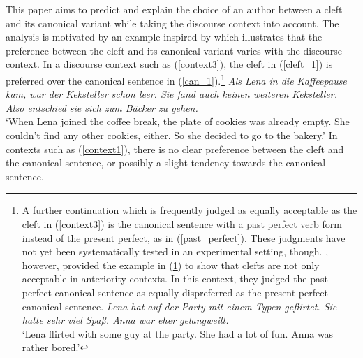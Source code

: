 \documentclass[output=paper,colorlinks,citecolor=brown]{langscibook}
\begin{document}
This paper aims to predict and explain the choice of an author between a cleft and its canonical variant while taking the discourse context into account. The analysis is motivated by an example inspired by \citet{tonnis_2021} which illustrates that the preference between the cleft and its canonical variant varies with the discourse context. In a discourse context such as (\ref{context3}), the cleft in (\ref{cleft_1}) is preferred over the canonical sentence in (\ref{can_1}).\footnote{A further continuation which is frequently judged as equally acceptable as the cleft in (\ref{context3}) is the canonical sentence with a past perfect verb form instead of the present perfect, as in (\ref{past_perfect}). These judgments have not yet been systematically tested in an experimental setting, though.
\z
%
\citet[678]{tonnis_tonhauser_2022}, however, provided the example in (\ref{past_perfect2}) to show that clefts are not only acceptable in anteriority contexts. In this context, they judged the past perfect canonical sentence as equally dispreferred as the present perfect canonical sentence.
\ea\label{past_perfect2}\textit{Lena hat auf der Party mit einem Typen geflirtet. Sie hatte sehr viel Spaß. Anna war eher gelangweilt.}\\
`Lena flirted with some guy at the party. She had a lot of fun. Anna was
rather bored.’
\z
\z
}
\ea\label{context3}\textit{Als Lena in die Kaffeepause kam, war der Keksteller schon leer. Sie fand auch keinen weiteren Keksteller. Also entschied sie sich zum Bäcker zu gehen.}\\
`When Lena joined the coffee break, the plate of cookies was already empty. She couldn't find any other cookies, either. So she decided to go to the bakery.'
\label{can_1}
\label{cleft_1}
\z
\z
%
In contexts such as (\ref{context1}), there is no clear preference between the cleft and the canonical sentence, or possibly a slight tendency towards the canonical sentence.
\end{document}
